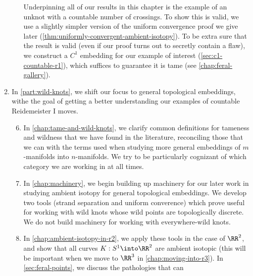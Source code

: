 \begin{enumerate}[label=(\Roman*)]
\begin{enumerate}[label=\arabic*)]
        Underpinning all of our results in this chapter is the example
        of an unknot with a countable number of crossings. To show
        this is valid, we use a slightly simpler version of the
        uniform convergence proof we give later
        (\cref{thm:uniformly-convergent-ambient-isotopy}). To be extra
        sure that the result is valid (even if our proof turns out to
        secretly contain a flaw), we construct a $C^1$ embedding for
        our example of interest (\cref{sec:c1-countable-r1}),
        which suffices to guarantee it is tame (see
        \cref{chap:feral-gallery}).
    \end{enumerate}
  \item In \cref{part:wild-knots}, we shift our focus to general
    topological embeddings, withe the goal of getting a better
    understanding our examples of countable Reidemeister I moves.
    \begin{enumerate}[label=\arabic*)]
        \setcounter{enumii}{5}
      \item In \cref{chap:tame-and-wild-knots}, we clarify common
        definitions for tameness and wildness that we have found in
        the literature, reconciling those that we can with the terms
        used when studying more general embeddings of $m$-manifolds
        into $n$-manifolds. We try to be particularly cognizant of
        which category we are working in at all times.
      \item In \cref{chap:machinery}, we begin building up machinery
        for our later work in studying ambient isotopy for general
        topological embeddings. We develop two tools (strand
        separation and uniform converence) which prove useful for
        working with wild knots whose wild points are topologically
        discrete. We do not build machinery for working with
        everywhere-wild knots.
      \item In \cref{chap:ambient-isotopy-in-r2}, we apply these tools
        in the case of $\RR^2$, and show that all curves $K : S^1
        \into \RR^2$ are ambient isotopic (this will be important when
        we move to $\RR^3$ in \cref{chap:moving-into-r3}). In
        \cref{sec:feral-points}, we discuss the pathologies that can

\end{enumerate}
\end{enumerate}

